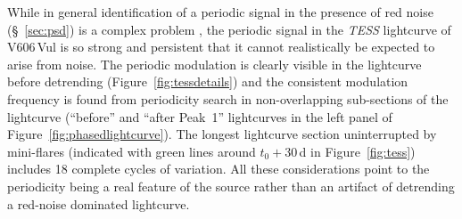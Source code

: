 \documentclass[twocolumn]{aastex631}
\newcommand{\nova}{V606\,Vul}
\begin{document}
While in general identification of a periodic signal in the presence of red noise (\S~\ref{sec:psd}) is a complex problem 
\citep{2006MNRAS.373..231P,2010MNRAS.402..307V,2016MNRAS.461.3145V,2021MNRAS.508.3975K}, 
the periodic signal in the {\em TESS} lightcurve of \nova{} is so strong and persistent 
that it cannot realistically be expected to arise from noise. 
The periodic modulation is clearly visible in the lightcurve before detrending (Figure~\ref{fig:tessdetails}) 
and the consistent modulation frequency is found from periodicity search in non-overlapping sub-sections of 
the lightcurve (``before'' and ``after Peak~1'' lightcurves in the left panel of Figure~\ref{fig:phasedlightcurve}). 
The longest lightcurve section uninterrupted by mini-flares (indicated with green lines around $t_0 +30$\,d in Figure~\ref{fig:tess}) 
includes 18 complete cycles of variation. All these considerations point to the periodicity being a real feature of the source rather 
than an artifact of detrending a red-noise dominated lightcurve.
\end{document}

